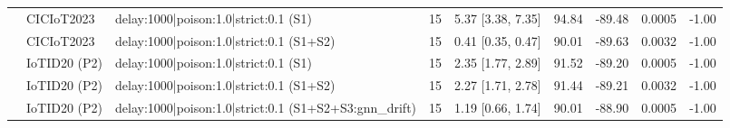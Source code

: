 \begin{table}[t]
\begin{tabular}{lllcccccc}
 & CICIoT2023 & delay:1000|poison:1.0|strict:0.1 (S1) & 15 & 5.37 [3.38, 7.35] & 94.84 & -89.48 & 0.0005 & -1.00 \\
 & CICIoT2023 & delay:1000|poison:1.0|strict:0.1 (S1+S2) & 15 & 0.41 [0.35, 0.47] & 90.01 & -89.63 & 0.0032 & -1.00 \\
 & IoTID20 (P2) & delay:1000|poison:1.0|strict:0.1 (S1) & 15 & 2.35 [1.77, 2.89] & 91.52 & -89.20 & 0.0005 & -1.00 \\
 & IoTID20 (P2) & delay:1000|poison:1.0|strict:0.1 (S1+S2) & 15 & 2.27 [1.71, 2.78] & 91.44 & -89.21 & 0.0032 & -1.00 \\
 & IoTID20 (P2) & delay:1000|poison:1.0|strict:0.1 (S1+S2+S3:gnn\_drift) & 15 & 1.19 [0.66, 1.74] & 90.01 & -88.90 & 0.0005 & -1.00 \\
\bottomrule
\end{tabular}
\end{table}
